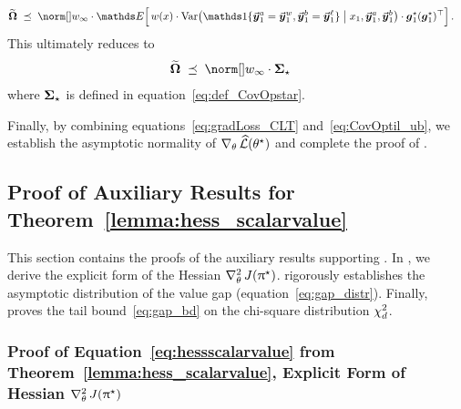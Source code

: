 	\begin{align*}
		\CovOptil
        & \; \preceq \; \supnorm{\weight} \cdot \Exp\Big[ \, \weight(\prompt) \cdot \Var \big( \indicator\{ \responseonei{1} = \responsewini{1}, \responsetwoi{1} = \responselosei{1} \} \bigm|  \prompti{1}, \responseonei{1}, \responsetwoi{1} \big) \cdot \gradstari{1} (\gradstari{1})^{\top} \Big] \, .
    \end{align*}
    This ultimately reduces to
    \begin{align}
    	\label{eq:CovOptil_ub}
         \CovOptil & \; \preceq \; \supnorm{\weight} \cdot \CovOpstar
	\end{align}
	where $\boldsymbol{\Sigma}_{\star}$ is defined in equation~\eqref{eq:def_CovOpstar}.
    
    Finally, by combining equations~\eqref{eq:gradLoss_CLT} and~\eqref{eq:CovOptil_ub}, we establish the asymptotic normality of $\nabla_{\theta} \,  \widehat{\mathcal{L}}(\theta^{\star})$ and complete the proof of .
    
    
	
	\subsection{Proof of Auxiliary Results for Theorem~\ref{lemma:hess_scalarvalue} \yaqidone}
	\label{sec:proof:lemma:hess_scalarvalue_aux}
	
	This section contains the proofs of the auxiliary results supporting . In , we derive the explicit form of the Hessian $ \nabla_{\theta}^2 \,  J(\uppi^{\star}) $.  rigorously establishes the asymptotic distribution of the value gap (equation~\eqref{eq:gap_distr}). Finally,  proves the tail bound~\eqref{eq:gap_bd} on the chi-square distribution $ \chi^2_{d} $.
	
	\subsubsection{Proof of Equation~\eqref{eq:hessscalarvalue} from Theorem~\ref{lemma:hess_scalarvalue}, Explicit Form of Hessian $\nabla_{\theta}^2 \,  J(\uppi^{\star})$}
	\label{sec:proof:eq:hessscalarvalue}
	
